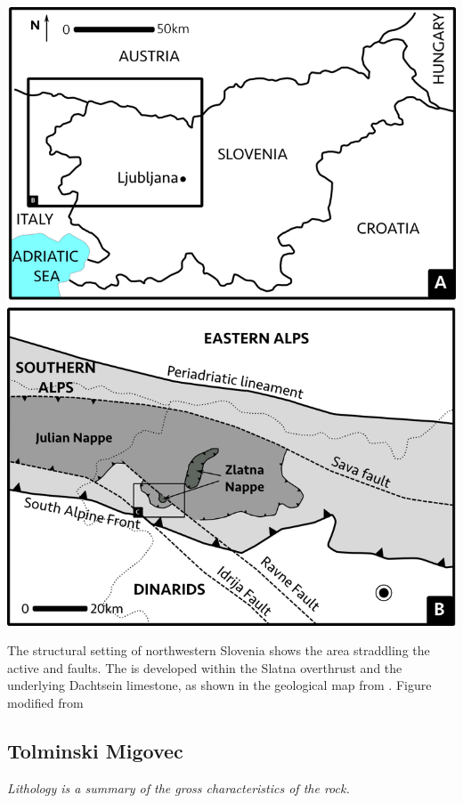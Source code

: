 \begin{map}[b!]
\checkoddpage \ifoddpage \forcerectofloat \else \forceversofloat \fi
\includegraphics[width = \textwidth]{images/maps-of-mig/geology_large.png}
\caption[Structural setting of NW Slovenia]{The structural setting of northwestern Slovenia shows the \protect{} area straddling the active \protect{} and \protect{} faults. The \protect{} is developed within the Slatna overthrust and the underlying Dachtsein limestone, as shown in the geological map from \citet{buser1986tolmavc}. Figure modified from \citet{vsmuc2009tectonic}}
\label{map:geol large scale}
\end{map}

\subsection{Tolminski Migovec}
\emph{Lithology is a summary of the gross characteristics of the rock.}

